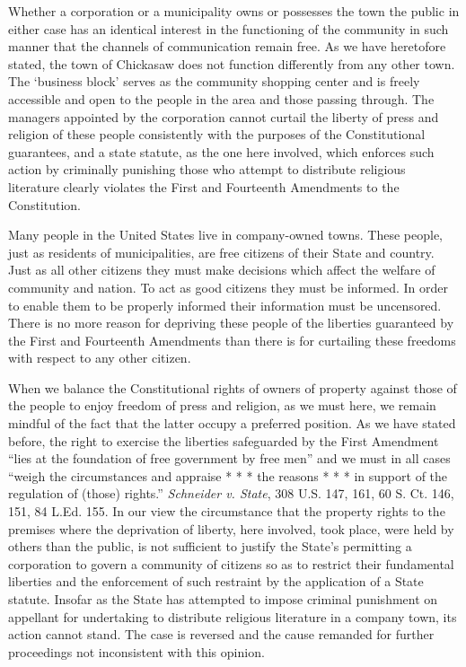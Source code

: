Whether a corporation or a municipality owns or possesses the town the public in
either case has an identical interest in the functioning of the community in
such manner that the channels of communication remain free. As we have
heretofore stated, the town of Chickasaw does not function differently from any
other town. The `business block' serves as the community shopping center and is
freely accessible and open to the people in the area and those passing through.
The managers appointed by the corporation cannot curtail the liberty of press
and religion of these people consistently with the purposes of the
Constitutional guarantees, and a state statute, as the one here involved, which
enforces such action by criminally punishing those who attempt to distribute
religious literature clearly violates the First and Fourteenth Amendments to
the Constitution.

Many people in the United States live in company-owned towns.  These people,
just as residents of municipalities, are free citizens of their State and
country. Just as all other citizens they must make decisions which affect the
welfare of community and nation. To act as good citizens they must be informed.
In order to enable them to be properly informed their information must be
uncensored. There is no more reason for depriving these people of the liberties
guaranteed by the First and Fourteenth Amendments than there is for
curtailing these freedoms with respect to any other citizen.

When we balance the Constitutional rights of owners of property against those of
the people to enjoy freedom of press and religion, as we must here, we remain
mindful of the fact that the latter occupy a preferred position.  As we have
stated before, the right to exercise the liberties safeguarded by the First
Amendment ``lies at the foundation of free government by free men'' and we must
in all cases ``weigh the circumstances and appraise * * * the reasons * * * in
support of the regulation of (those) rights.'' \textit{Schneider v. State}, 308
U.S. 147, 161, 60 S. Ct. 146, 151, 84 L.Ed. 155. In our view the circumstance
that the property rights to the premises where the deprivation of liberty, here
involved, took place, were held by others than the public, is not sufficient to
justify the State's permitting a corporation to govern a community of citizens
so as to restrict their fundamental liberties and the enforcement of such
restraint by the application of a State statute. Insofar as the State has
attempted to impose criminal punishment on appellant for undertaking to
distribute religious literature in a company town, its action cannot stand. The
case is reversed and the cause remanded for further proceedings not
inconsistent with this opinion.

